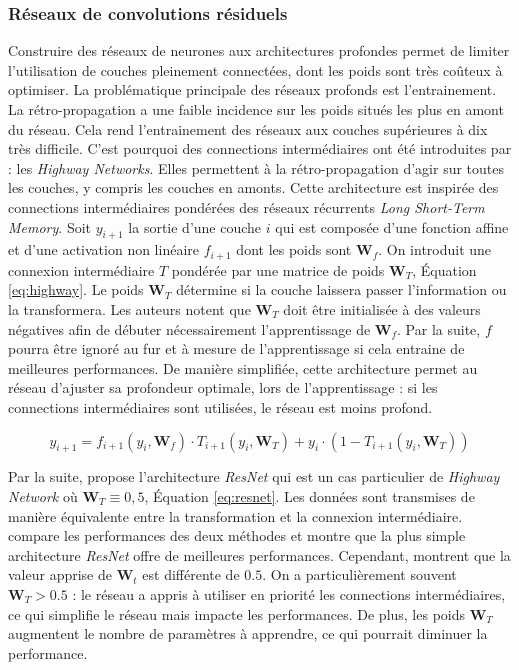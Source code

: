 \subsubsection{Réseaux de convolutions résiduels} \label{subsubsec:ResNet}
Construire des réseaux de neurones aux architectures profondes permet de limiter l'utilisation de couches pleinement connectées, dont les poids sont très coûteux à optimiser.
La problématique principale des réseaux profonds est l'entrainement.
La rétro-propagation a une faible incidence sur les poids situés les plus en amont du réseau.
Cela rend l'entrainement des réseaux aux couches supérieures à dix très difficile.
C'est pourquoi des connections intermédiaires ont été introduites par \citeauthor{srivastava_highway_2015} \cite{srivastava_highway_2015, srivastava_training_2015} : les \textit{Highway Networks}.
Elles permettent à la rétro-propagation d'agir sur toutes les couches, y compris les couches en amonts.
Cette architecture est inspirée des connections intermédiaires pondérées des réseaux récurrents \textit{Long Short-Term Memory}.
Soit $y_{i+1}$ la sortie d'une couche $i$ qui est composée d'une fonction affine et d'une activation non linéaire $f_{i+1}$ dont les poids sont $\mathbf{W}_f$.
On introduit une connexion intermédiaire $T$ pondérée par une matrice de poids $\mathbf{W}_T$, Équation \ref{eq:highway}.
Le poids $\mathbf{W}_T$ détermine si la couche laissera passer l'information ou la transformera.
Les auteurs notent que $\mathbf{W}_T$ doit être initialisée à des valeurs négatives afin de débuter nécessairement l'apprentissage de $\mathbf{W}_f$.
Par la suite, $f$ pourra être ignoré au fur et à mesure de l'apprentissage si cela entraine de meilleures performances.
De manière simplifiée, cette architecture permet au réseau d'ajuster sa profondeur optimale, lors de l'apprentissage : si les connections intermédiaires sont utilisées, le réseau est moins profond.

\begin{equation} \label{eq:highway}
y_{i+1} = f_{i+1}\left(y_{i}, \mathbf{W}_f\right) \cdot T_{i+1}\left(y_{i}, \mathbf{W}_{T}\right)+y_{i} \cdot \left(1- T_{i+1}\left(y_{i}, \mathbf{W}_{T}\right)\right)
\end{equation}

Par la suite, \citeauthor{he_deep_2015} \cite{he_deep_2015} propose l'architecture \textit{ResNet} qui est un cas particulier de \textit{Highway Network} où $\mathbf{W}_T \equiv 0,5$, Équation \ref{eq:resnet}.
Les données sont transmises de manière équivalente entre la transformation et la connexion intermédiaire.
\cite{he_identity_2016} compare les performances des deux méthodes et montre que la plus simple architecture \textit{ResNet} offre de meilleures performances.
Cependant, \citeauthor{srivastava_highway_2015} \cite{srivastava_highway_2015} montrent que la valeur apprise de $\mathbf{W}_t$ est différente de $0.5$.
On a particulièrement souvent $\mathbf{W}_T > 0.5$ : le réseau a appris à utiliser en priorité les connections intermédiaires, ce qui simplifie le réseau mais impacte les performances.
De plus, les poids $\mathbf{W}_T$ augmentent le nombre de paramètres à apprendre, ce qui pourrait diminuer la performance.

